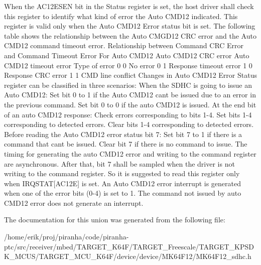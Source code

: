 When the A\+C12\+E\+S\+EN bit in the Status register is set, the host driver shall check this register to identify what kind of error the Auto C\+M\+D12 indicated. This register is valid only when the Auto C\+M\+D12 Error status bit is set. The following table shows the relationship between the Auto C\+M\+G\+D12 C\+RC error and the Auto C\+M\+D12 command timeout error. Relationship between Command C\+RC Error and Command Timeout Error For Auto C\+M\+D12 Auto C\+M\+D12 C\+RC error Auto C\+M\+D12 timeout error Type of error 0 0 No error 0 1 Response timeout error 1 0 Response C\+RC error 1 1 C\+MD line conflict Changes in Auto C\+M\+D12 Error Status register can be classified in three scenarios\+: When the S\+D\+HC is going to issue an Auto C\+M\+D12\+: Set bit 0 to 1 if the Auto C\+M\+D12 can\textquotesingle{}t be issued due to an error in the previous command. Set bit 0 to 0 if the auto C\+M\+D12 is issued. At the end bit of an auto C\+M\+D12 response\+: Check errors corresponding to bits 1-\/4. Set bits 1-\/4 corresponding to detected errors. Clear bits 1-\/4 corresponding to detected errors. Before reading the Auto C\+M\+D12 error status bit 7\+: Set bit 7 to 1 if there is a command that can\textquotesingle{}t be issued. Clear bit 7 if there is no command to issue. The timing for generating the auto C\+M\+D12 error and writing to the command register are asynchronous. After that, bit 7 shall be sampled when the driver is not writing to the command register. So it is suggested to read this register only when I\+R\+Q\+S\+T\+AT\mbox{[}A\+C12E\mbox{]} is set. An Auto C\+M\+D12 error interrupt is generated when one of the error bits (0-\/4) is set to 1. The command not issued by auto C\+M\+D12 error does not generate an interrupt. 

The documentation for this union was generated from the following file\+:\begin{DoxyCompactItemize}
\item 
/home/erik/proj/piranha/code/piranha-\/ptc/src/receiver/mbed/\+T\+A\+R\+G\+E\+T\+\_\+\+K64\+F/\+T\+A\+R\+G\+E\+T\+\_\+\+Freescale/\+T\+A\+R\+G\+E\+T\+\_\+\+K\+P\+S\+D\+K\+\_\+\+M\+C\+U\+S/\+T\+A\+R\+G\+E\+T\+\_\+\+M\+C\+U\+\_\+\+K64\+F/device/device/\+M\+K64\+F12/M\+K64\+F12\+\_\+sdhc.\+h\end{DoxyCompactItemize}
